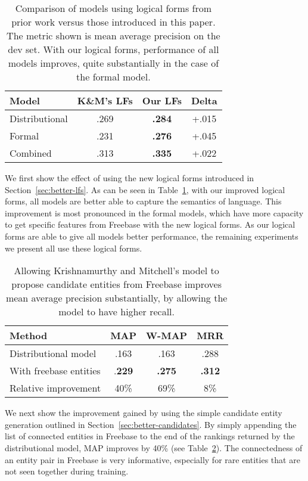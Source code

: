 \documentclass[11pt,letterpaper]{article}
\newcommand{\secref}[1]{Section~\ref{sec:#1}}
\newcommand{\tabref}[1]{Table~\ref{tab:#1}}
\begin{document}
\begin{table}
  \centering
  {\small
    \begin{tabular}{lccc}
      \toprule
      Model & K\&M's LFs & Our LFs & Delta \\
      \midrule
      Distributional & .269 & \textbf{.284} & +.015 \\
      \midrule
      Formal & .231 & \textbf{.276} & +.045 \\
      \midrule
      Combined & .313 & \textbf{.335} & +.022 \\
      \bottomrule
    \end{tabular}
  }
  \caption{Comparison of models using logical forms from prior work versus
  those introduced in this paper.  The metric shown is mean average precision
  on the dev set.  With our logical forms, performance of all models improves,
  quite substantially in the case of the formal model.}
  \label{tab:better-lfs}
\end{table}

We first show the effect of using the new logical forms introduced in
\secref{better-lfs}.  As can be seen in \tabref{better-lfs}, with our improved
logical forms, all models are better able to capture the semantics of language.
This improvement is most pronounced in the formal models, which have more
capacity to get specific features from Freebase with the new logical forms.  As
our logical forms are able to give all models better performance, the remaining
experiments we present all use these logical forms.

\begin{table}
  \centering
  {\small
    \begin{tabular}{lccc}
      \toprule
      Method & MAP & W-MAP & MRR \\
      \midrule
      Distributional model & .163 & .163 & .288 \\
      \midrule
      With freebase entities & .\textbf{229} & \textbf{.275} & \textbf{.312} \\
      \midrule
      \midrule
      Relative improvement & 40\% & 69\% & 8\% \\
      \bottomrule
    \end{tabular}
  }
  \caption{Allowing Krishnamurthy and Mitchell's model to propose candidate
  entities from Freebase improves mean average precision substantially, by
  allowing the model to have higher recall.}
  \label{tab:better-candidates}
\end{table}

We next show the improvement gained by using the simple candidate entity
generation outlined in \secref{better-candidates}.  By simply appending the
list of connected entities in Freebase to the end of the rankings returned by
the distributional model, MAP improves by 40\% (see
\tabref{better-candidates}).  The connectedness of an entity pair in Freebase
is very informative, especially for rare entities that are not seen together
during training.
\end{document}
